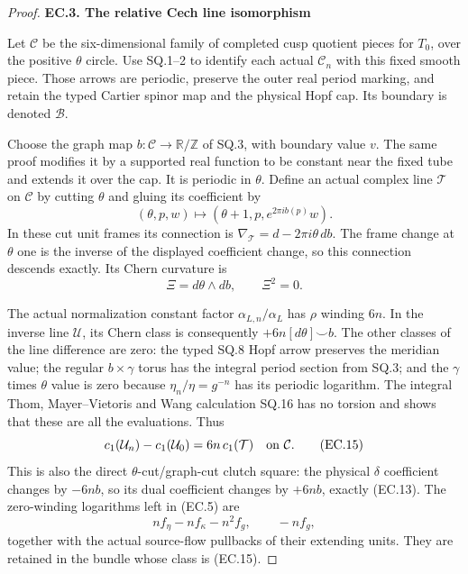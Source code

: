 \begin{proof}
\par

\medskip\noindent\textbf{EC.3. The relative Cech line isomorphism}

\par\nobreak

Let \(\mathcal C\) be the six-dimensional family of completed cusp
quotient pieces for \(T_0\), over the positive \(\theta\) circle. Use
SQ.1--2 to identify each actual \(\mathcal C_n\) with this fixed
smooth piece. Those arrows are periodic, preserve the outer real
period marking, and retain the typed Cartier spinor map and the
physical Hopf cap. Its boundary is denoted \(\mathcal B\).

Choose the graph map \(b:\mathcal C\to\mathbb R/\mathbb Z\) of
SQ.3, with boundary value \(v\). The same proof modifies it by a
supported real function to be constant near the fixed tube and
extends it over the cap. It is periodic in \(\theta\). Define an actual
complex line \(\mathcal T\) on \(\mathcal C\) by cutting \(\theta\)
and gluing its coefficient by
\[
 (\theta,p,w)\longmapsto
       (\theta+1,p,e^{2\pi i b(p)}w).
                                                        \tag{EC.13}
\]
In these cut unit frames its connection is
\(\nabla_{\mathcal T}=d-2\pi i\theta\,db\). The frame change at
\(\theta\) one is the inverse of the displayed coefficient change, so
this connection descends exactly. Its Chern curvature is
\[
                         \Xi=d\theta\wedge db,\qquad \Xi^2=0.
                                                        \tag{EC.14}
\]

The actual normalization constant factor
\(\alpha_{L,n}/\alpha_L\) has \(\rho\) winding \(6n\). In the inverse
line \(\mathcal U\), its Chern class is consequently
\(+6n[d\theta]\smile b\). The other classes of the line difference
are zero: the typed SQ.8 Hopf arrow preserves the meridian value;
the regular \(b\times\gamma\) torus has the integral period section
from SQ.3; and the \(\gamma\) times \(\theta\) value is zero because
\(\eta_n/\eta=g^{-n}\) has its periodic logarithm. The integral
Thom, Mayer--Vietoris and Wang calculation SQ.16 has no torsion
and shows that these are all the evaluations. Thus
\[
 c_1(\mathcal U_n)-c_1(\mathcal U_0)
                   =6n\,c_1(\mathcal T)
             \quad\hbox{on }\mathcal C.               \tag{EC.15}
\]
This is also the direct \(\theta\)-cut/graph-cut clutch square: the
physical \(\delta\) coefficient changes by \(-6n b\), so its dual
coefficient changes by \(+6n b\), exactly (EC.13).
The zero-winding logarithms left in (EC.5) are
\[
 nf_\eta-nf_\kappa-n^2f_g,\qquad -nf_g,
                                                        \tag{EC.16}
\]
together with the actual source-flow pullbacks of their extending
units. They are retained in the bundle whose class is (EC.15).


\end{proof}
